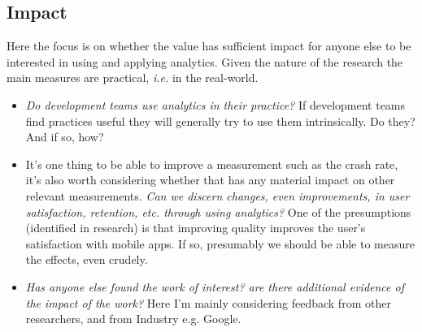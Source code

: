 \subsection{Impact}
Here the focus is on whether the value has sufficient impact for anyone else to be interested in using and applying analytics. Given the nature of the research the main measures are practical, \emph{i.e.} in the real-world.
\begin{itemize}
    \item \emph{Do development teams use analytics in their practice?} If development teams find practices useful they will generally try to use them intrinsically. Do they? And if so, how?
    \item It's one thing to be able to improve a measurement such as the crash rate, it's also worth considering whether that has any material impact on other relevant measurements. \emph{Can we discern changes, even improvements, in user satisfaction, retention, etc. through using analytics?} One of the presumptions (identified in research) is that improving quality improves the user's satisfaction with mobile apps. If so, presumably we should be able to measure the effects, even crudely.
    \item \emph{Has anyone else found the work of interest? are there additional evidence of the impact of the work?} Here I'm mainly considering feedback from other researchers, and from Industry e.g. Google.
\end{itemize}

